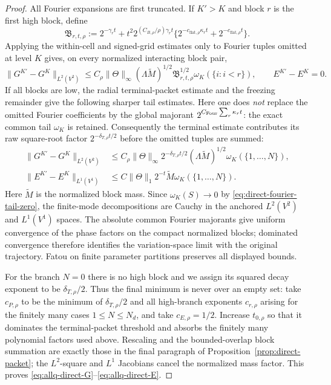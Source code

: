 \documentclass[11pt]{article}
\numberwithin{equation}{section}
\theoremstyle{remark}
\theoremstyle{definition}
\begin{document}
\begin{proof}
All Fourier expansions are first truncated. If $K'>K$ and block $r$
is the first high block, define
\[
 \mathfrak B_{r,t,\rho}
 :=2^{-\gamma_rt}
 +t^2 2^{(C_{B,\rho}/\rho)\gamma_rt}
   \{2^{-c_{\mathrm{flat},\rho}\kappa_rt}
      +2^{-c_{\mathrm{flat},\rho}t}\}.
\]
Applying the within-cell and signed-grid estimates only to Fourier tuples
omitted at level $K$ gives, on every normalized interacting block pair,
\begin{equation}\label{eq:allq-direct-high-fourier-cauchy}
 \|G^{K'}-G^K\|_{L^2(V^2)}
 \le C_\rho\|\Theta\|_\infty(\Lambda\widetilde M)^{1/2}
       \mathfrak B_{r,t,\rho}^{1/2}\omega_K(\{i:i<r\}),
 \qquad E^{K'}-E^K=0.
\end{equation}
If all blocks are low, the radial terminal-packet estimate and the
freezing remainder give the following sharper tail estimates.  Here one
does \emph{not} replace the omitted Fourier coefficients by the global
majorant $2^{C_{\rm Four}\sum_r\kappa_rt}$: the exact common tail
$\omega_K$ is retained.  Consequently the terminal estimate contributes
its raw square-root factor $2^{-\delta_{T,\rho}t/2}$ before the omitted
tuples are summed:
\begin{align}
 \|G^{K'}-G^K\|_{L^2(V^2)}
 &\le C_\rho\|\Theta\|_\infty
       2^{-\delta_{T,\rho}t/2}
       (\Lambda\widetilde M)^{1/2}\omega_K(\{1,\ldots,N\}),
 \label{eq:allq-direct-low-good-cauchy}\\
 \|E^{K'}-E^K\|_{L^1(V^1)}
 &\le C\|\Theta\|_1 2^{-t}\widetilde M
       \omega_K(\{1,\ldots,N\}).
 \label{eq:allq-direct-low-error-cauchy}
\end{align}
Here $\widetilde M$ is the normalized block mass. Since
$\omega_K(S)\to0$ by \eqref{eq:direct-fourier-tail-zero}, the finite-mode
decompositions are Cauchy in the anchored $L^2(V^2)$ and $L^1(V^1)$
spaces. The absolute common Fourier majorants give uniform convergence
of the phase factors on the compact normalized blocks; dominated
convergence therefore identifies the variation-space limit with the
original trajectory. Fatou on finite parameter partitions preserves all
displayed bounds.

For the branch $N=0$ there is no high block and we assign its squared
decay exponent to be $\delta_{T,\rho}/2$.  Thus the final minimum is never
over an empty set: take $c_{P,\rho}$ to be the minimum of
$\delta_{T,\rho}/2$ and all high-branch exponents $c_{r,\rho}$ arising
for the finitely many cases $1\le N\le N_d$, and take
$c_{E,\rho}=1/2$. Increase $t_{0,\rho}$ so that it dominates the
terminal-packet threshold and absorbs the finitely many polynomial
factors used above. Rescaling and the bounded-overlap block summation are
exactly those in the final paragraph of Proposition~\ref{prop:direct-packet};
the $L^2$-square and $L^1$ Jacobians cancel the normalized mass factor.
This proves \eqref{eq:allq-direct-G}--\eqref{eq:allq-direct-E}.
\end{proof}
\end{document}
